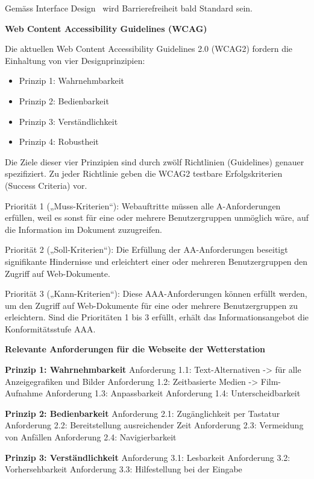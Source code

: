 Gemäss \flqq Interface Design\frqq ~\cite{ThesmannStephan2016ID:U} wird Barrierefreiheit bald Standard sein.







\textbf{Web Content Accessibility Guidelines (WCAG)}

Die aktuellen Web Content Accessibility Guidelines 2.0 (WCAG2) fordern die Einhaltung von vier Designprinzipien:

\begin{itemize}  
\item Prinzip 1: Wahrnehmbarkeit 
\item Prinzip 2: Bedienbarkeit
\item Prinzip 3: Verständlichkeit
\item Prinzip 4: Robustheit
\end{itemize}

Die Ziele dieser vier Prinzipien sind durch zwölf Richtlinien (Guidelines) genauer spezifiziert. Zu jeder Richtlinie geben die WCAG2 testbare Erfolgskriterien (Success Criteria) vor.

Priorität 1 („Muss-Kriterien“): Webauftritte müssen alle A-Anforderungen erfüllen, weil es sonst für eine oder mehrere Benutzergruppen unmöglich wäre, auf die Information im Dokument zuzugreifen.

Priorität 2 („Soll-Kriterien“): Die Erfüllung der AA-Anforderungen beseitigt signifikante Hindernisse und erleichtert einer oder mehreren Benutzergruppen den Zugriff auf Web-Dokumente.

Priorität 3 („Kann-Kriterien“): Diese AAA-Anforderungen können erfüllt werden, um den Zugriff auf Web-Dokumente für eine oder mehrere Benutzergruppen zu erleichtern. Sind die Prioritäten 1 bis 3 erfüllt, erhält das Informationsangebot die Konformitätsstufe AAA.

\textbf{Relevante Anforderungen für die Webseite der Wetterstation}

\textbf{Prinzip 1: Wahrnehmbarkeit}
Anforderung 1.1: Text-Alternativen 
-> für alle Anzeigegrafiken und Bilder
Anforderung 1.2: Zeitbasierte Medien 
-> Film-Aufnahme
Anforderung 1.3: Anpassbarkeit
Anforderung 1.4: Unterscheidbarkeit


\textbf{Prinzip 2: Bedienbarkeit}
Anforderung 2.1: Zugänglichkeit per Tastatur
Anforderung 2.2: Bereitstellung ausreichender Zeit
Anforderung 2.3: Vermeidung von Anfällen
Anforderung 2.4: Navigierbarkeit


\textbf{Prinzip 3: Verständlichkeit}
Anforderung 3.1: Lesbarkeit
Anforderung 3.2: Vorhersehbarkeit
Anforderung 3.3: Hilfestellung bei der Eingabe


